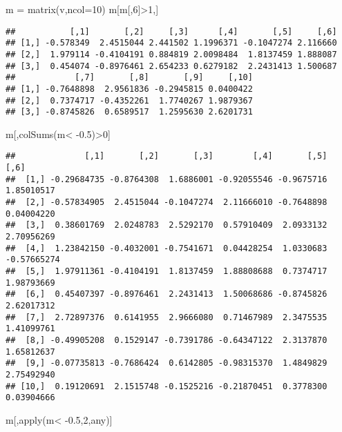 \documentclass[]{article}
\newenvironment{Shaded}{\begin{snugshade}}{\end{snugshade}}
\newcommand{\AttributeTok}[1]{\textcolor[rgb]{0.77,0.63,0.00}{#1}}
\newcommand{\DecValTok}[1]{\textcolor[rgb]{0.00,0.00,0.81}{#1}}
\newcommand{\FloatTok}[1]{\textcolor[rgb]{0.00,0.00,0.81}{#1}}
\newcommand{\FunctionTok}[1]{\textcolor[rgb]{0.00,0.00,0.00}{#1}}
\newcommand{\NormalTok}[1]{#1}
\newcommand{\OtherTok}[1]{\textcolor[rgb]{0.56,0.35,0.01}{#1}}
\newcommand{\SpecialCharTok}[1]{\textcolor[rgb]{0.00,0.00,0.00}{#1}}
\begin{document}
\begin{Shaded}
\begin{Highlighting}[]
\NormalTok{m }\OtherTok{=} \FunctionTok{matrix}\NormalTok{(v,}\AttributeTok{ncol=}\DecValTok{10}\NormalTok{)}
\NormalTok{m[m[,}\DecValTok{6}\NormalTok{]}\SpecialCharTok{\textgreater{}}\DecValTok{1}\NormalTok{,]}
\end{Highlighting}
\end{Shaded}

\begin{verbatim}
##           [,1]       [,2]     [,3]      [,4]       [,5]     [,6]
## [1,] -0.578349  2.4515044 2.441502 1.1996371 -0.1047274 2.116660
## [2,]  1.979114 -0.4104191 0.884819 2.0098484  1.8137459 1.888087
## [3,]  0.454074 -0.8976461 2.654233 0.6279182  2.2431413 1.500687
##            [,7]       [,8]       [,9]     [,10]
## [1,] -0.7648898  2.9561836 -0.2945815 0.0400422
## [2,]  0.7374717 -0.4352261  1.7740267 1.9879367
## [3,] -0.8745826  0.6589517  1.2595630 2.6201731
\end{verbatim}

\begin{Shaded}
\begin{Highlighting}[]
\NormalTok{m[,}\FunctionTok{colSums}\NormalTok{(m}\SpecialCharTok{\textless{}} \SpecialCharTok{{-}}\FloatTok{0.5}\NormalTok{)}\SpecialCharTok{\textgreater{}}\DecValTok{0}\NormalTok{]}
\end{Highlighting}
\end{Shaded}

\begin{verbatim}
##              [,1]       [,2]       [,3]        [,4]       [,5]        [,6]
##  [1,] -0.29684735 -0.8764308  1.6886001 -0.92055546 -0.9675716  1.85010517
##  [2,] -0.57834905  2.4515044 -0.1047274  2.11666010 -0.7648898  0.04004220
##  [3,]  0.38601769  2.0248783  2.5292170  0.57910409  2.0933132  2.70956269
##  [4,]  1.23842150 -0.4032001 -0.7541671  0.04428254  1.0330683 -0.57665274
##  [5,]  1.97911361 -0.4104191  1.8137459  1.88808688  0.7374717  1.98793669
##  [6,]  0.45407397 -0.8976461  2.2431413  1.50068686 -0.8745826  2.62017312
##  [7,]  2.72897376  0.6141955  2.9666080  0.71467989  2.3475535  1.41099761
##  [8,] -0.49905208  0.1529147 -0.7391786 -0.64347122  2.3137870  1.65812637
##  [9,] -0.07735813 -0.7686424  0.6142805 -0.98315370  1.4849829  2.75492940
## [10,]  0.19120691  2.1515748 -0.1525216 -0.21870451  0.3778300  0.03904666
\end{verbatim}

\begin{Shaded}
\begin{Highlighting}[]
\NormalTok{m[,}\FunctionTok{apply}\NormalTok{(m}\SpecialCharTok{\textless{}} \SpecialCharTok{{-}}\FloatTok{0.5}\NormalTok{,}\DecValTok{2}\NormalTok{,any)]}
\end{Highlighting}
\end{Shaded}
\end{document}
